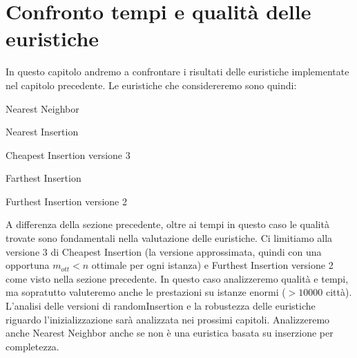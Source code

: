 \documentclass[a4paper,12pt]{report}
\begin{document}
\section{Confronto tempi e qualità delle euristiche}
In questo capitolo andremo a confrontare i risultati delle euristiche implementate nel capitolo precedente. Le euristiche che considereremo sono quindi:
\begin{legal}
  \item Nearest Neighbor
  \item Nearest Insertion
  \item Cheapest Insertion versione 3
  \item Farthest Insertion
  \item Furthest Insertion versione 2
\end{legal}
A differenza della sezione precedente, oltre ai tempi in questo caso le qualità trovate sono fondamentali nella valutazione delle euristiche. Ci limitiamo alla versione 3 di Cheapest Insertion (la versione approssimata, quindi con una opportuna $m_{ott} < n$ ottimale per ogni istanza) e Furthest Insertion versione 2 come visto nella sezione precedente. In questo caso analizzeremo qualità e tempi, ma sopratutto valuteremo anche le prestazioni su istanze enormi ($> 10000$ città). L'analisi delle versioni di randomInsertion e la robustezza delle euristiche riguardo l'inizializzazione sarà analizzata nei prossimi capitoli. Analizzeremo anche Nearest Neighbor anche se non è una euristica basata su inserzione per completezza.
\end{document}
